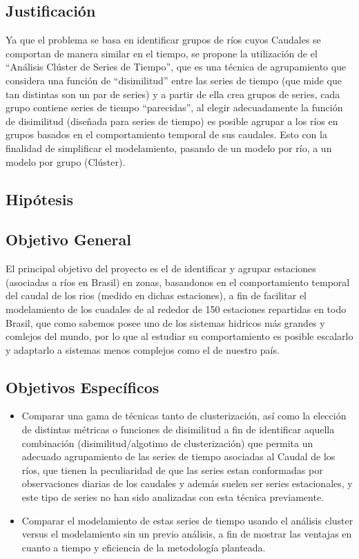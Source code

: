 \documentclass[10pt,a5paper]{article}
\begin{document}
\subsection{Justificación}
Ya que el problema se basa en identificar grupos de ríos cuyos Caudales se comportan de manera similar en el tiempo, se propone la utilización de el “Análisis Clúster de Series de Tiempo”, que es una técnica de agrupamiento que considera una función de “disimilitud” entre las series de tiempo (que mide que tan distintas son un par de series) y a partir de ella crea grupos de series, cada grupo contiene series de tiempo “parecidas”, al elegir adecuadamente la función de disimilitud (diseñada para series de tiempo) es posible agrupar a los ríos en grupos basados en el comportamiento temporal de sus caudales. Esto con la finalidad de simplificar el modelamiento, pasando de un modelo por río, a un modelo por grupo (Clúster).

\subsection{Hipótesis}


\subsection{Objetivo General}
El principal objetivo del proyecto es el de identificar y agrupar estaciones (asociadas a ríos en Brasil) en zonas, basandonos en el comportamiento temporal del caudal de los rios (medido en dichas estaciones), a fin de facilitar el modelamiento de los cuadales de al rededor de 150 estaciones repartidas en todo Brasil, que como sabemos posee uno de los sistemas hidricos más grandes y comlejos del mundo, por lo que al estudiar su comportamiento es posible escalarlo y adaptarlo a sistemas menos complejos como el de nuestro país.

\subsection{Objetivos Específicos}
\begin{itemize}

\item Comparar una gama de técnicas tanto de clusterización, así como la elección de distintas métricas o funciones de disimilitud a fin de identificar aquella combinación (disimilitud/algotimo de clusterización) que permita un adecuado agrupamiento de las series de tiempo asociadas al Caudal de los ríos, que tienen la peculiaridad de que las series estan conformadas por observaciones diarias de los caudales y además suelen ser series estacionales, y este tipo de series no han sido analizadas con esta técnica previamente.

\item Comparar el modelamiento de estas series de tiempo usando el análisis cluster versus el modelamiento sin un previo análisis, a fin de mostrar las ventajas en cuanto a tiempo y eficiencia de la metodología planteada.

\end{itemize}
\end{document}

